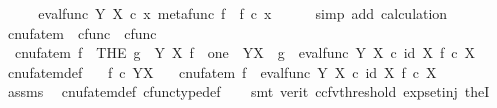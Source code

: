 \begin{isabellebody}
\ \ \isamarkupfalse%
\ \isamarkupfalse%
\ {\isachardoublequoteopen}eval{\isacharunderscore}{\kern0pt}func\ Y\ X\ {\isasymcirc}\isactrlsub c\ {\isasymlangle}x{\isacharcomma}{\kern0pt}\ metafunc\ f{\isasymrangle}\ {\isacharequal}{\kern0pt}\ f\ {\isasymcirc}\isactrlsub c\ x{\isachardoublequoteclose}\isanewline
\ \ \ \ \isamarkupfalse%
\ {\isacharparenleft}{\kern0pt}simp\ add{\isacharcolon}{\kern0pt}\ calculation{\isacharparenright}{\kern0pt}\isanewline
{}\isamarkupfalse%
%
\endisatagproof
{\isafoldproof}%
%
\isadelimproof
%
\endisadelimproof
%
\isadelimdocument
%
\endisadelimdocument
%
\isatagdocument
%
\isamarkuptrue%
%
\endisatagdocument
{\isafolddocument}%
%
\isadelimdocument
%
\endisadelimdocument
{}\isamarkupfalse%
\ cnufatem\ {\isacharcolon}{\kern0pt}{\isacharcolon}{\kern0pt}\ {\isachardoublequoteopen}cfunc\ {\isasymRightarrow}\ cfunc{\isachardoublequoteclose}\ \isanewline
\ \ {\isachardoublequoteopen}cnufatem\ f\ {\isacharequal}{\kern0pt}\ {\isacharparenleft}{\kern0pt}THE\ g{\isachardot}{\kern0pt}\ {\isasymforall}\ Y\ X{\isachardot}{\kern0pt}\ f\ {\isacharcolon}{\kern0pt}\ one\ {\isasymrightarrow}\ Y\isactrlbsup X\isactrlesup \ {\isasymlongrightarrow}\ g\ {\isacharequal}{\kern0pt}\ eval{\isacharunderscore}{\kern0pt}func\ Y\ X\ {\isasymcirc}\isactrlsub c\ {\isasymlangle}id\ X{\isacharcomma}{\kern0pt}\ f\ {\isasymcirc}\isactrlsub c\ {\isasymbeta}\isactrlbsub X\isactrlesub {\isasymrangle}{\isacharparenright}{\kern0pt}{\isachardoublequoteclose}\isanewline
\isanewline
{}\isamarkupfalse%
\ cnufatem{\isacharunderscore}{\kern0pt}def{}{\isacharcolon}{\kern0pt}\isanewline
\ \ \ {\isachardoublequoteopen}f\ {\isasymin}\isactrlsub c\ Y\isactrlbsup X\isactrlesup {\isachardoublequoteclose}\isanewline
\ \ \ {\isachardoublequoteopen}cnufatem\ f\ {\isacharequal}{\kern0pt}\ eval{\isacharunderscore}{\kern0pt}func\ Y\ X\ {\isasymcirc}\isactrlsub c\ {\isasymlangle}id\ X{\isacharcomma}{\kern0pt}\ f\ {\isasymcirc}\isactrlsub c\ {\isasymbeta}\isactrlbsub X\isactrlesub {\isasymrangle}{\isachardoublequoteclose}\isanewline
%
\isadelimproof
\ \ %
\endisadelimproof
%
\isatagproof
{}\isamarkupfalse%
\ assms\ \isamarkupfalse%
\ cnufatem{\isacharunderscore}{\kern0pt}def\ cfunc{\isacharunderscore}{\kern0pt}type{\isacharunderscore}{\kern0pt}def\isanewline
\ \ \isamarkupfalse%
\ {\isacharparenleft}{\kern0pt}smt\ {\isacharparenleft}{\kern0pt}verit{\isacharcomma}{\kern0pt}\ ccfv{\isacharunderscore}{\kern0pt}threshold{\isacharparenright}{\kern0pt}\ exp{\isacharunderscore}{\kern0pt}set{\isacharunderscore}{\kern0pt}inj\ theI{\isacharprime}{\kern0pt}{\isacharparenright}{\kern0pt}%

\end{isabellebody}
